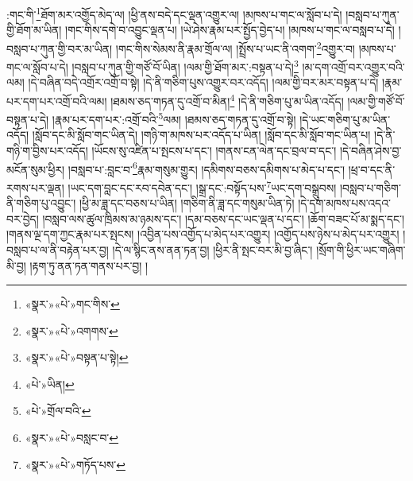 :གང་གི་\footnote{«སྣར་»«པེ་»གང་གིས་}ཐོག་མར་འགྱོད་མེད་ལ། །ཕྱི་ནས་བདེ་དང་ལྡན་འགྱུར་ལ། །མཁས་པ་གང་ལ་སློབ་པ་དེ། །བསླབ་པ་ཀུན་གྱི་ཐོག་མ་ཡིན། །གང་གིས་དགེ་བ་འབྱུང་ལྡན་པ། །ཡེ་ཤེས་རྣམ་པར་སྤྱོད་བྱེད་པ། །མཁས་པ་གང་ལ་བསླབ་པ་དེ། །བསླབ་པ་ཀུན་གྱི་བར་མ་ཡིན། །གང་གིས་སེམས་ནི་རྣམ་གྲོལ་ལ། །སྤྲོས་པ་ཡང་ནི་འགག་\footnote{«སྣར་»«པེ་»འགགས་}འགྱུར་བ། །མཁས་པ་གང་ལ་སློབ་པ་དེ། །བསླབ་པ་ཀུན་གྱི་གཙོ་བོ་ཡིན། །ལམ་གྱི་ཐོག་མར་:བསྟན་པ་དེ།\footnote{«སྣར་»«པེ་»བསྟན་པ་སྟེ།} །མ་དག་འགྲོ་བར་འགྱུར་བའི་ལམ། །དེ་བཞིན་བདེ་འགྲོར་འགྲོ་བ་སྟེ། །དེ་ནི་གཅིག་པུས་འགྱུར་བར་འདོད། །ལམ་གྱི་བར་མར་བསྟན་པ་དེ། །རྣམ་པར་དག་པར་འགྲོ་བའི་ལམ། །ཐམས་ཅད་གཏན་དུ་འགྲོ་བ་མིན།\footnote{«པེ་»ཡིན།} །དེ་ནི་གཅིག་པུ་མ་ཡིན་འདོད། །ལམ་གྱི་གཙོ་བོ་བསྟན་པ་དེ། །རྣམ་པར་དག་པར་:འགྲོ་བའི་\footnote{«པེ་»གྲོལ་བའི་}ལམ། །ཐམས་ཅད་གཏན་དུ་འགྲོ་བ་སྟེ། །དེ་ཡང་གཅིག་པུ་མ་ཡིན་འདོད། །སློབ་དང་མི་སློབ་གང་ཡིན་དེ། །གཉི་ག་མཁས་པར་འདོད་པ་ཡིན། །སློབ་དང་མི་སློབ་གང་ཡིན་པ། །དེ་ནི་གཉི་ག་བྱིས་པར་འདོད། །ཡོངས་སུ་འཛིན་པ་སྤངས་པ་དང་། །གནས་ངན་ལེན་དང་བྲལ་བ་དང་། །དེ་བཞིན་ཤེས་བྱ་མངོན་སུམ་ཕྱིར། །བསླབ་པ་:བླང་བ་\footnote{«སྣར་»«པེ་»བསླང་བ་}རྣམ་གསུམ་གྱུར། །དམིགས་བཅས་དམིགས་པ་མེད་པ་དང་། །ཕྲ་བ་དང་ནི་རགས་པར་ལྡན། །ཡང་དག་བླང་དང་རབ་དབེན་དང་། །སྒྲ་དང་:བསྟོད་པས་\footnote{«སྣར་»«པེ་»གཏོད་པས་}ཡང་དག་བསྒྲུབས། །བསླབ་པ་གཅིག་ནི་གཅིག་པུ་འབྱུང་། །ཕྱི་མ་ཟླ་དང་བཅས་པ་ཡིན། །གཅིག་ནི་ཟླ་དང་གསུམ་ཡིན་ཏེ། །དེ་དག་མཁས་པས་འདའ་བར་བྱེད། །བསླབ་ལས་ཚུལ་ཁྲིམས་མ་ཉམས་དང་། །དམ་བཅས་དང་ཡང་ལྡན་པ་དང་། །ཆོག་བཟང་པོ་མ་སྨད་དང་། །གནས་ལྔ་དག་ཀྱང་རྣམ་པར་སྤངས། །འབྱིན་པས་འགྱོད་པ་མེད་པར་འགྱུར། །འགྱོད་པས་ཉེས་པ་མེད་པར་འགྱུར། །བསླབ་པ་ལ་ནི་བརྟེན་པར་བྱ། །དེ་ལ་སྙིང་ནས་ནན་ཏན་བྱ། །ཕྱིར་ནི་སྤང་བར་མི་བྱ་ཞིང་། །སྲོག་གི་ཕྱིར་ཡང་གཞིག་མི་བྱ། །རྟག་ཏུ་ནན་ཏན་གནས་པར་བྱ། །
